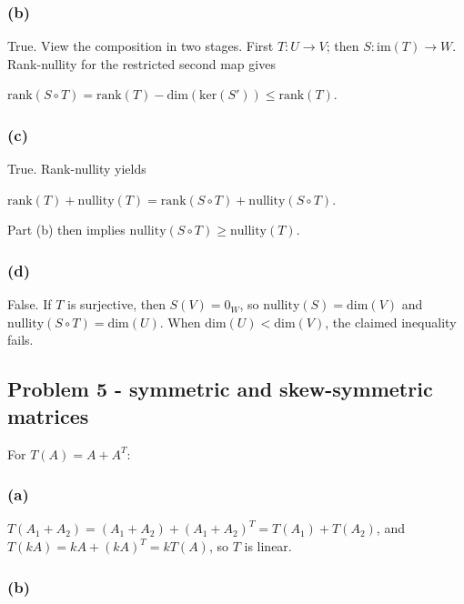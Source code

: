 \subsubsection{(b)}

True. View the composition in two stages. First \(T:U\rightarrow V\); then \(S:\text{im}(T)\rightarrow W\). Rank-nullity for the restricted second map gives

\(\text{rank}\left( {S \circ T} \right) = \text{rank}(T) - \text{dim}\left( {\text{ker}\left( S' \right)} \right) \leq \text{rank}(T).\)

\subsubsection{(c)}

True. Rank-nullity yields

\(\text{rank}(T) + \text{nullity}(T) = \text{rank}\left( {S \circ T} \right) + \text{nullity}\left( {S \circ T} \right).\)

Part (b) then implies \(\text{nullity}\left( {S \circ T} \right) \geq \text{nullity}(T)\).

\subsubsection{(d)}

False. If \(T\) is surjective, then \(S(V) = 0_{W}\), so \(\text{nullity}(S) = \text{dim}(V)\) and \(\text{nullity}\left( {S \circ T} \right) = \text{dim}(U)\). When \(\text{dim}(U) < \text{dim}(V)\), the claimed inequality fails.

\subsection{Problem 5 - symmetric and skew-symmetric matrices}

For \(T(A) = A + A^{T}\):

\subsubsection{(a)}

\(T\left( {A_{1} + A_{2}} \right) = \left( {A_{1} + A_{2}} \right) + \left( {A_{1} + A_{2}} \right)^{T} = T\left( A_{1} \right) + T\left( A_{2} \right)\), and \(T\left( {kA} \right) = kA + \left( {kA} \right)^{T} = kT(A)\), so \(T\) is linear.

\subsubsection{(b)}

